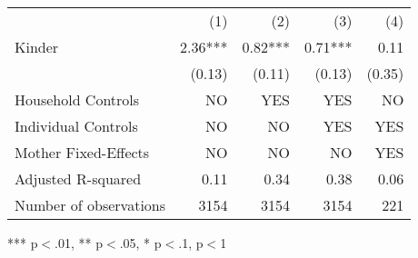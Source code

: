 \begin{tabular}{lllll}
\cline{1-5}
\multicolumn{1}{c}{} &
  \multicolumn{1}{r}{(1)} &
  \multicolumn{1}{r}{(2)} &
  \multicolumn{1}{r}{(3)} &
  \multicolumn{1}{r}{(4)} \\
\cline{1-5}
\multicolumn{1}{l}{Kinder} &
  \multicolumn{1}{r}{2.36***} &
  \multicolumn{1}{r}{0.82***} &
  \multicolumn{1}{r}{0.71***} &
  \multicolumn{1}{r}{0.11 } \\
\multicolumn{1}{l}{} &
  \multicolumn{1}{r}{(0.13)} &
  \multicolumn{1}{r}{(0.11)} &
  \multicolumn{1}{r}{(0.13)} &
  \multicolumn{1}{r}{(0.35)} \\
\multicolumn{1}{l}{Household Controls} &
  \multicolumn{1}{r}{NO} &
  \multicolumn{1}{r}{YES} &
  \multicolumn{1}{r}{YES} &
  \multicolumn{1}{r}{NO} \\
\multicolumn{1}{l}{Individual Controls} &
  \multicolumn{1}{r}{NO} &
  \multicolumn{1}{r}{NO} &
  \multicolumn{1}{r}{YES} &
  \multicolumn{1}{r}{YES} \\
\multicolumn{1}{l}{Mother Fixed-Effects} &
  \multicolumn{1}{r}{NO} &
  \multicolumn{1}{r}{NO} &
  \multicolumn{1}{r}{NO} &
  \multicolumn{1}{r}{YES} \\
\multicolumn{1}{l}{Adjusted R-squared} &
  \multicolumn{1}{r}{0.11} &
  \multicolumn{1}{r}{0.34} &
  \multicolumn{1}{r}{0.38} &
  \multicolumn{1}{r}{0.06} \\
\multicolumn{1}{l}{Number of observations} &
  \multicolumn{1}{r}{3154} &
  \multicolumn{1}{r}{3154} &
  \multicolumn{1}{r}{3154} &
  \multicolumn{1}{r}{221} \\
\cline{1-5}
\end{tabular}

\footnotesize{
*** p$<$.01, ** p$<$.05, * p$<$.1,  p$<$1
}
